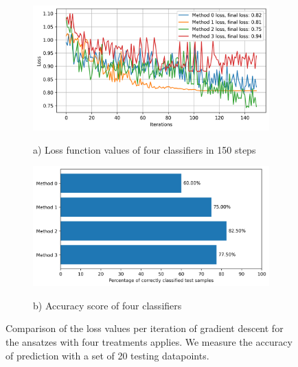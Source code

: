 \begin{figure}
    \begin{subfigure}{\linewidth}
        \includegraphics[width=\linewidth]{Artefact/Appendices/loss_cobyla.png}
        \centerline{a) Loss function values of four classifiers in 150 steps}
    \end{subfigure}
    \begin{subfigure}{\linewidth}
        \includegraphics[width=\linewidth]{Artefact/Appendices/accuracy.png}
        \centerline{b) Accuracy score of four classifiers}
    \end{subfigure}

    \caption{
        Comparison of the loss values per iteration of gradient descent for the ansatzes with four treatments applies.
        We measure the accuracy of prediction with a set of 20 testing datapoints.
    }
    \label{Fig: Plot Loss and Accuracy}
\end{figure}

